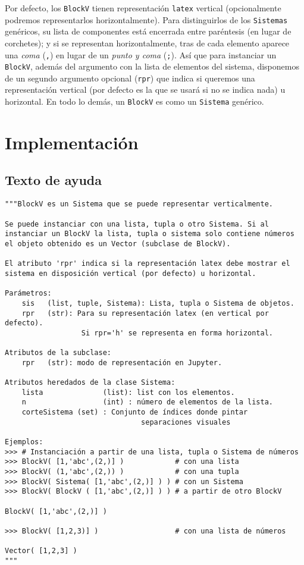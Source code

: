 \documentclass[11pt]{report}
\begin{document}
Por defecto, los \texttt{BlockV} tienen representación \texttt{latex} vertical
(opcionalmente podremos representarlos horizontalmente). Para
distinguirlos de los \texttt{Sistemas} genéricos, su lista de componentes
está encerrada entre paréntesis (en lugar de corchetes); y si se
representan horizontalmente, tras de cada elemento aparece una \emph{coma}
(\texttt{,}) en lugar de un \emph{punto y coma} (\texttt{;}). Así que para instanciar un
\texttt{BlockV}, además del argumento con la lista de elementos del sistema,
disponemos de un segundo argumento opcional (\texttt{rpr}) que indica si
queremos una representación vertical (por defecto es la que se usará
si no se indica nada) u horizontal. En todo lo demás, un \texttt{BlockV} es
como un \texttt{Sistema} genérico.

\section{Implementación}
\label{sec:orgc775dc6}

\subsection{Texto de ayuda}
\label{sec:org5739c81}

\begin{verbatim}
"""BlockV es un Sistema que se puede representar verticalmente.

Se puede instanciar con una lista, tupla o otro Sistema. Si al
instanciar un BlockV la lista, tupla o sistema solo contiene números
el objeto obtenido es un Vector (subclase de BlockV).

El atributo 'rpr' indica si la representación latex debe mostrar el
sistema en disposición vertical (por defecto) u horizontal.

Parámetros:
    sis   (list, tuple, Sistema): Lista, tupla o Sistema de objetos.
    rpr   (str): Para su representación latex (en vertical por defecto).
                  Si rpr='h' se representa en forma horizontal. 

Atributos de la subclase:
    rpr   (str): modo de representación en Jupyter.

Atributos heredados de la clase Sistema:
    lista              (list): list con los elementos.
    n                  (int) : número de elementos de la lista.
    corteSistema (set) : Conjunto de índices donde pintar
                                separaciones visuales

Ejemplos:
>>> # Instanciación a partir de una lista, tupla o Sistema de números
>>> BlockV( [1,'abc',(2,)] )            # con una lista
>>> BlockV( (1,'abc',(2,)) )            # con una tupla
>>> BlockV( Sistema( [1,'abc',(2,)] ) ) # con un Sistema
>>> BlockV( BlockV ( [1,'abc',(2,)] ) ) # a partir de otro BlockV

BlockV( [1,'abc',(2,)] )

>>> BlockV( [1,2,3)] )                  # con una lista de números

Vector( [1,2,3] )
"""
\end{verbatim}
\end{document}
